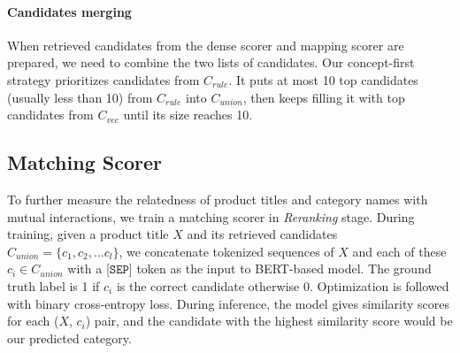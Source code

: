 

\paragraph{Candidates merging} 
When retrieved candidates from the dense scorer and mapping scorer are prepared, we need to combine the two lists of candidates. Our concept-first strategy prioritizes candidates from ${C_{rule}}$. It puts at most 10 top candidates (usually less than 10) from ${C_{rule}}$ into $C_{union}$, then keeps filling it with top candidates from $C_{vec}$ 
until its size reaches 10.


\subsection{Matching Scorer}
\label{matching-scorer}
To further measure the relatedness of product titles and category names with mutual interactions, we train a matching scorer in \textit{Reranking} stage.
During training, given a product title $X$ and its retrieved candidates $C_{union}=\{c_1, c_2, ... c_l\}$, we concatenate tokenized sequences of $X$ and each of these $c_i \in C_{union}$ with a [$\mathtt{SEP}$] token as the input to BERT-based model. 
The ground truth label is 1 if $c_i$ is the correct candidate otherwise 0. Optimization is followed with binary cross-entropy loss.
During inference, the model gives similarity scores for each ($X$, $c_i$) pair, and the candidate with the highest similarity score would be our predicted category.

